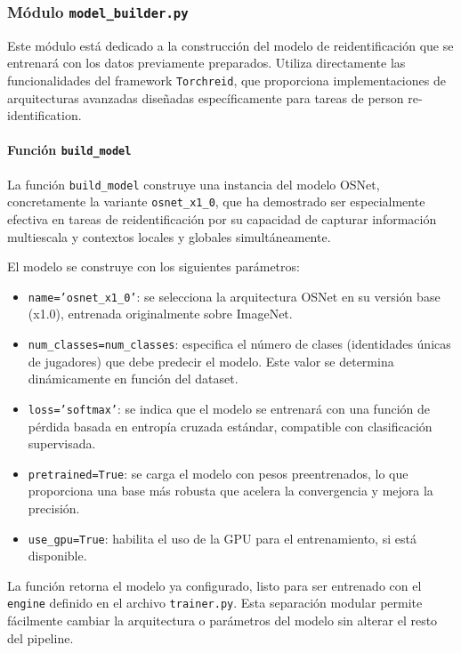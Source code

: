 \documentclass[12pt, a4paper, twoside]{article}
\begin{document}
	\subsubsection{Módulo \texttt{model\_builder.py}}
	
	Este módulo está dedicado a la construcción del modelo de reidentificación que se entrenará con los datos previamente preparados. Utiliza directamente las funcionalidades del framework \texttt{Torchreid}, que proporciona implementaciones de arquitecturas avanzadas diseñadas específicamente para tareas de person re-identification.
	
	\paragraph{Función \texttt{build\_model}}
	
	La función \texttt{build\_model} construye una instancia del modelo OSNet, concretamente la variante \texttt{osnet\_x1\_0}, que ha demostrado ser especialmente efectiva en tareas de reidentificación por su capacidad de capturar información multiescala y contextos locales y globales simultáneamente.
	
	El modelo se construye con los siguientes parámetros:
	
	\begin{itemize}
		\item \texttt{name='osnet\_x1\_0'}: se selecciona la arquitectura OSNet en su versión base (x1.0), entrenada originalmente sobre ImageNet.
		\item \texttt{num\_classes=num\_classes}: especifica el número de clases (identidades únicas de jugadores) que debe predecir el modelo. Este valor se determina dinámicamente en función del dataset.
		\item \texttt{loss='softmax'}: se indica que el modelo se entrenará con una función de pérdida basada en entropía cruzada estándar, compatible con clasificación supervisada.
		\item \texttt{pretrained=True}: se carga el modelo con pesos preentrenados, lo que proporciona una base más robusta que acelera la convergencia y mejora la precisión.
		\item \texttt{use\_gpu=True}: habilita el uso de la GPU para el entrenamiento, si está disponible.
	\end{itemize}
	
	La función retorna el modelo ya configurado, listo para ser entrenado con el \texttt{engine} definido en el archivo \texttt{trainer.py}. Esta separación modular permite fácilmente cambiar la arquitectura o parámetros del modelo sin alterar el resto del pipeline.
	
\end{document}
